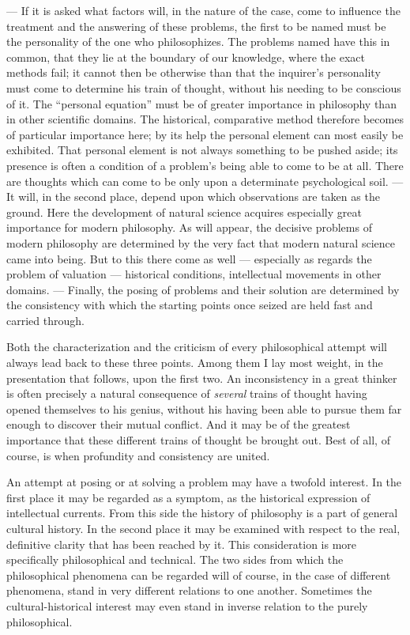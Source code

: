\documentclass[12pt,a4paper]{book}
\newcommand{\opage}[1]{\marginnote{\footnotesize\textit{[#1]}}}
\begin{document}
--- If it is asked what factors will, in the nature of the case, come to
influence the treatment and the answering of these problems, the first to be
named must be the personality of the one who philosophizes. The problems named
have this in common, that they lie at the boundary of our knowledge, where the
exact methods fail; it cannot then be otherwise than that the inquirer's
personality must come to determine his train of thought, without his needing to
be conscious of it. The ``personal equation'' must be of greater importance in
philosophy than in other scientific domains. The historical, comparative method
therefore becomes of particular importance here; by its help the personal
element can most easily be exhibited. That personal element is not always
something to be pushed aside; its presence is often a condition of a problem's
being able to come to be at all. There are thoughts which can come to be only
upon a determinate psychological soil. --- It will, in the second place, depend
upon which observations are taken as the ground. Here the development of natural
science acquires especially great importance for modern philosophy. As will
appear, the decisive problems of modern philosophy are determined by the very
fact that modern natural science came into being. But to this there come as well
--- especially as regards the problem of valuation --- historical conditions,
intellectual movements in other domains. --- Finally, the posing of problems and
their solution are determined by the consistency with which the starting points
once seized are held fast and carried through.

Both the characterization and the criticism of every philosophical attempt will
always lead back to these three points. Among them I lay most weight, in the
presentation that follows, upon the first two. An inconsistency in a great
thinker is often precisely a natural consequence of \emph{several} trains of
thought having opened themselves to his genius, without his having been able to
pursue them far enough to discover their mutual conflict. And it may be of the
greatest importance that these different trains of thought be brought out. Best
of all, of course, is when profundity and consistency are united.

An attempt at posing or at solving a problem may \opage{XV}have a twofold interest. In the
first place it may be regarded as a symptom, as the historical expression of
intellectual currents. From this side the history of philosophy is a part of
general cultural history. In the second place it may be examined with respect to
the real, definitive clarity that has been reached by it. This consideration is
more specifically philosophical and technical. The two sides from which the
philosophical phenomena can be regarded will of course, in the case of different
phenomena, stand in very different relations to one another. Sometimes the
cultural-historical interest may even stand in inverse relation to the purely
philosophical.
\end{document}
